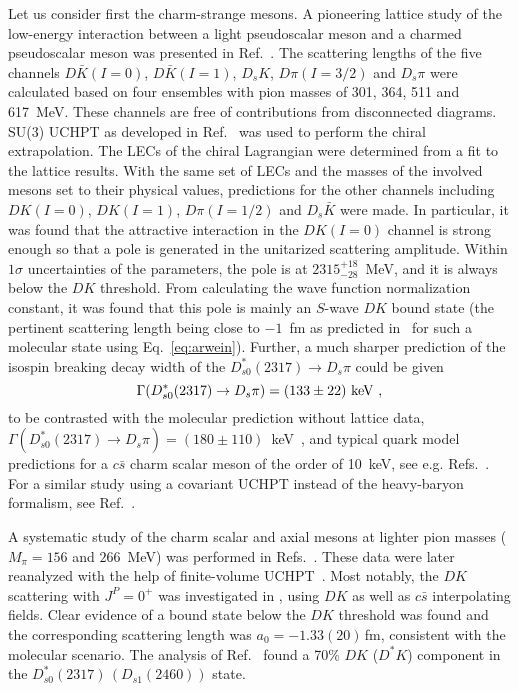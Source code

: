 Let us consider first the charm-strange mesons. A pioneering lattice study of
the low-energy interaction between a light pseudoscalar meson and a charmed
pseudoscalar meson was presented in Ref.~\cite{Liu:2012zya}.
The scattering lengths of the five channels $D\bar K(I=0)$, $D\bar K(I=1)$, $D_s
K$, $D\pi(I=3/2)$ and $D_s\pi$ were calculated based on four ensembles with pion
masses of 301, 364, 511 and 617~MeV. These channels are free of contributions
from disconnected diagrams.
SU(3) UCHPT as developed in Ref.~\cite{Guo:2009ct} was used to perform the
chiral extrapolation. The LECs of the chiral Lagrangian were determined from a
fit to the lattice results. With the same set of LECs and the masses of the
involved mesons set to their physical values,  predictions for the other
channels including $DK(I=0)$, $DK(I=1)$, $D\pi(I=1/2)$ and $D_s\bar K$ were
made. In particular, it was found that the attractive interaction in the
$DK(I=0)$ channel is strong enough so that a pole is generated in the unitarized
scattering amplitude.  Within $1\sigma$ uncertainties of the parameters, the
pole is at $2315^{+18}_{-28}$~MeV, and it is always below the $DK$ threshold.
From calculating the wave function normalization constant, it was found that
this pole is mainly an $S$-wave $DK$ bound state (the pertinent scattering
length being close to $-1$~fm as predicted in~\cite{Guo:2009ct} for such a
molecular state using Eq.~\eqref{eq:arwein}).
Further, a much sharper prediction of the isospin breaking  decay width of the
$D_{s0}^*(2317)\to D_s\pi$ could  be given
\begin{equation}
\label{Eq:DecayWidth}
 \Gamma(D_{s0}^*(2317)\to D_s \pi) = (133\pm22)~{\rm keV}~,
\end{equation}
to be contrasted with the molecular prediction without lattice
data, $\Gamma(D_{s0}^*(2317)\to D_s \pi)=(180\pm110)$~keV~\cite{Guo:2008gp},
and typical quark model predictions for a $c\bar s$ charm scalar meson of the 
order of 10~keV, see 
e.g. Refs.~\cite{Godfrey:2003kg,Faessler:2007gv}. For a similar study 
using a covariant UCHPT instead
of the heavy-baryon formalism, see Ref.~\cite{Altenbuchinger:2013vwa}.

A systematic study of the charm scalar and axial mesons at lighter
pion masses ($M_\pi = 156$ and $266$~MeV) was performed in 
Refs.~\cite{Mohler:2012na,Mohler:2013rwa,Lang:2014yfa}. These data
were later reanalyzed with the help of finite-volume 
UCHPT~\cite{Torres:2014vna}. Most notably, the $DK$ scattering with 
$J^P=0^+$ was investigated in \cite{Mohler:2013rwa}, using $DK$ as well
as $c\bar s$ interpolating fields. Clear evidence of a bound state below
the $DK$ threshold was found and the corresponding scattering length
was $a_0 = -1.33(20)\,$fm, consistent with the molecular scenario.
The analysis of Ref.~\cite{Torres:2014vna} found a 70\% $DK$ ($D^*K$) 
component in the $D_{s0}^*(2317)\,(D_{s1}(2460))$ state.

